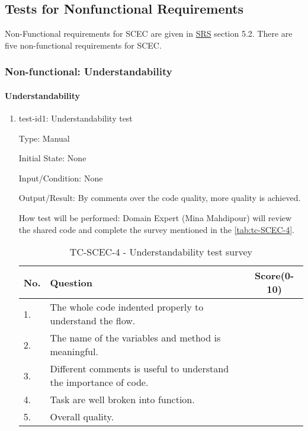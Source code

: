 \documentclass[12pt, titlepage]{article}
\begin{document}
\subsection{Tests for Nonfunctional Requirements}

Non-Functional requirements for SCEC are given in \href{https://github.com/DeeshaPatel/CAS-741-Solar-Cooker/blob/7c53c8d9a19ca2f94dfba6ba9208eae0bf03b8cc/docs/SRS/SRS.pdf}{SRS} section 5.2. There are five non-functional requirements for SCEC. 




\subsubsection{Non-functional: Understandability}
\label{non_functional_understandability}		
\paragraph{Understandability}

\begin{enumerate}

\item{test-id1: Understandability test\\}

Type: Manual
					
Initial State: None
					
Input/Condition: None
					
Output/Result: By comments over the code quality, more quality is achieved. 
					
How test will be performed: Domain Expert (Mina Mahdipour) will review the shared code and complete the survey mentioned in the \autoref{tab:tc-SCEC-4}.   

\begin{table}[h!]
\begin{center}
\begin{tabular}{ p{0.5cm}|p{10cm}|c }
\hline
No. &  Question   & Score(0-10) \\
\hline
1. & The whole code indented properly to understand the flow. & \\
2. & The name of the variables and method is meaningful. & \\
3. & Different comments is useful to understand the importance of code. &  \\
4. & Task are well broken into function. & \\
5. & Overall quality. & \\

\hline

\end{tabular}
\caption{TC-SCEC-4 - Understandability test survey}
\label{tab:tc-SCEC-4}
\end{center}
\end{table}

\end{enumerate}
\end{document}
